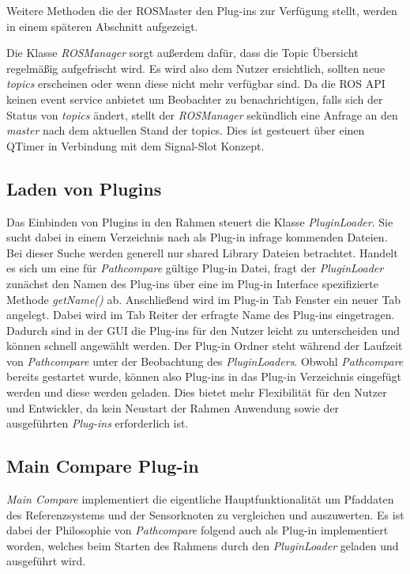 Weitere Methoden die der ROSMaster den Plug-ins zur Verfügung stellt, werden in einem
späteren Abschnitt aufgezeigt.

Die Klasse \textit{ROSManager} sorgt außerdem dafür, dass die Topic Übersicht
regelmäßig aufgefrischt wird. Es wird also dem Nutzer ersichtlich, sollten neue
\textit{topics} erscheinen oder wenn diese nicht mehr verfügbar sind.
Da die \gls{ROS} \gls{API} keinen event service anbietet um Beobachter zu benachrichtigen,
falls sich der Status von \textit{topics} ändert, stellt der
\textit{ROSManager} sekündlich eine Anfrage an den \textit{master} nach dem
aktuellen Stand der topics.  Dies ist gesteuert über einen QTimer in Verbindung
mit dem Signal-Slot Konzept.


\subsection{Laden von Plugins}
Das Einbinden von Plugins in den Rahmen steuert die Klasse
\textit{PluginLoader}. Sie sucht dabei in einem Verzeichnis nach als Plug-in
infrage kommenden Dateien. Bei dieser Suche werden generell nur shared Library
Dateien betrachtet. Handelt es sich um eine für \textit{Pathcompare} gültige
Plug-in Datei, fragt der \textit{PluginLoader} zunächst den Namen des Plug-ins
über eine im Plug-in Interface spezifizierte Methode \textit{getName()} ab.
Anschließend wird im Plug-in Tab Fenster ein neuer Tab angelegt. Dabei wird im
Tab Reiter der erfragte Name des Plug-ins eingetragen. Dadurch sind in der GUI die Plug-ins für den
Nutzer leicht zu unterscheiden und können schnell angewählt werden.
Der Plug-in Ordner steht während der Laufzeit von \textit{Pathcompare}
unter der Beobachtung des \textit{PluginLoaders}. 
Obwohl \textit{Pathcompare} bereits gestartet wurde, können also Plug-ins in das Plug-in
Verzeichnis eingefügt werden und diese werden geladen. Dies bietet mehr Flexibilität für den
Nutzer und Entwickler, da kein Neustart der Rahmen Anwendung sowie der ausgeführten
\textit{Plug-ins} erforderlich ist.


\subsection{Main Compare Plug-in}
\label{sub:maincompare}


\textit{Main Compare} implementiert die eigentliche Hauptfunktionalität um Pfaddaten des
Referenzsystems und der Sensorknoten zu vergleichen und auszuwerten. 
Es ist dabei der Philosophie von \textit{Pathcompare} folgend auch als Plug-in
implementiert worden, welches beim Starten des Rahmens durch den
\textit{PluginLoader} geladen und ausgeführt wird.

